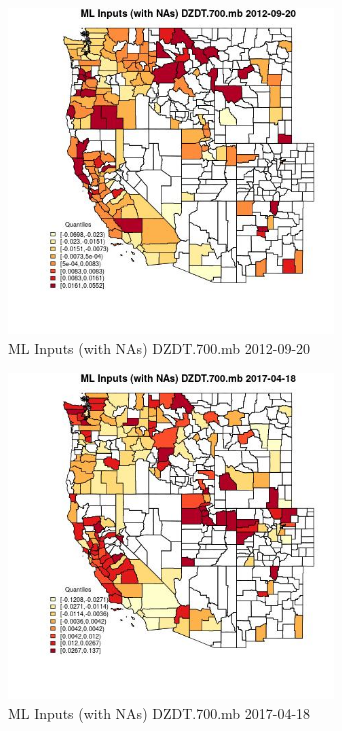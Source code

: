 \clearpage 

\begin{figure} 
\centering  
\includegraphics[width=0.77\textwidth]{Code_Outputs/Report_ML_input_PM25_Step4_part_e_de_duplicated_aves_compiled_2019-05-14wNAs_CountyDZDT700mbMean2012-09-20_2012-09-20.jpg} 
\caption{\label{fig:Report_ML_input_PM25_Step4_part_e_de_duplicated_aves_compiled_2019-05-14wNAsCountyDZDT700mbMean2012-09-20_2012-09-20}ML Inputs (with NAs) DZDT.700.mb 2012-09-20} 
\end{figure} 
 

\begin{figure} 
\centering  
\includegraphics[width=0.77\textwidth]{Code_Outputs/Report_ML_input_PM25_Step4_part_e_de_duplicated_aves_compiled_2019-05-14wNAs_CountyDZDT700mbMean2017-04-18_2017-04-18.jpg} 
\caption{\label{fig:Report_ML_input_PM25_Step4_part_e_de_duplicated_aves_compiled_2019-05-14wNAsCountyDZDT700mbMean2017-04-18_2017-04-18}ML Inputs (with NAs) DZDT.700.mb 2017-04-18} 
\end{figure} 
 

